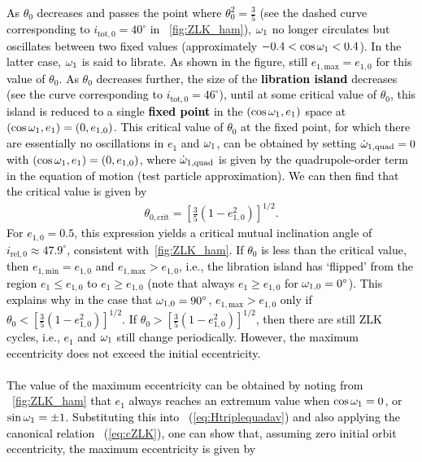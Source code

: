 \documentclass[main.tex]{subfiles}
\begin{document}
\begin{tcolorbox}[sharp corners, colback=green!30, colframe=green!80!blue, title=Box \ref{boxchap3:dynVI} -- Orbital dynamics VI (continued)]
\par \textcolor{black}{
As $\theta_0$ decreases and passes the point where $\theta_0^2 = \frac{3}{5}$ (see the dashed curve corresponding to $i_{\mathrm{tot},0} = 40^\circ$ in \F~\ref{fig:ZLK_ham}), $\omega_1$ no longer circulates but oscillates between two fixed values (approximately $-0.4 < \cos\omega_1 < 0.4$). In the latter case, $\omega_1$ is said to librate. As shown in the figure, still $e_{1,\mathrm{max}} = e_{1,0}$ for this value of $\theta_0$. As $\theta_0$ decreases further, the size of the {\bf libration island} decreases (see the curve corresponding to $i_{\mathrm{tot},0} = 46^\circ$), until at some critical value of $\theta_0$, this island is reduced to a single {\bf fixed point} in the $(\cos\omega_1,e_1)$ space at $(\cos \omega_1,e_1) = (0,e_{1,0})$. This critical value of $\theta_0$ at the fixed point, for which there are essentially no oscillations in $e_1$ and $\omega_1$, can be obtained by setting $\dot{\omega}_{1,\mathrm{quad}} = 0$ with $(\cos\omega_1,e_1) = (0,e_{1,0})$, where $\dot{\omega}_{1,\mathrm{quad}}$ is given by the quadrupole-order term in the equation of motion (test particle approximation). We can then find that the critical value is given by
\begin{align}
\theta_{0,\mathrm{crit}} = \left [\frac{3}{5} \left(1-e_{1,0}^2 \right) \right ]^{1/2}.
\end{align}
For $e_{1,0} = 0.5$, this expression yields a critical mutual inclination angle of $i_{\mathrm{rel},0} \approx 47.9^\circ$, consistent with \F\,\ref{fig:ZLK_ham}. If $\theta_0$ is less than the critical value, then $e_{1,\mathrm{min}} = e_{1,0}$ and $e_{1,\mathrm{max}} > e_{1,0}$, i.e., the libration island has `flipped' from the region $e_1 \leq e_{1,0}$ to $e_1 \geq e_{1,0}$ (note that always $e_1 \geq e_{1,0}$ for $\omega_{1,0} = 0^\circ$). This explains why in the case that $\omega_{1,0} = 90^\circ$, $e_{1,\mathrm{max}} > e_{1,0}$ only if $\theta_0 < \left [\frac{3}{5} \left(1-e_{1,0}^2 \right) \right ]^{1/2}$. If $\theta_0 > \left [\frac{3}{5} \left(1-e_{1,0}^2 \right) \right ]^{1/2}$, then there are still ZLK cycles, i.e., $e_1$ and $\omega_1$ still change periodically. However, the maximum eccentricity does not exceed the initial eccentricity. \\ \\
The value of the maximum eccentricity can be obtained by noting from \F~\ref{fig:ZLK_ham} that $e_1$ always reaches an extremum value when $\cos\omega_1=0$, or $\sin\omega_1 = \pm 1$. Substituting this into \Eq~(\ref{eq:Htriplequadav}) and also applying the canonical relation \Eq~(\ref{eq:cZLK}), one can show that, assuming zero initial orbit eccentricity, the maximum eccentricity is given by
}
\end{tcolorbox}
\end{document}
